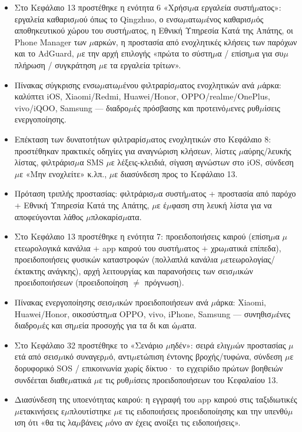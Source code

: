 
\begin{itemize}
  \item Στο Κεφάλαιο 13 προστέθηκε η ενότητα 6 «Χρήσι$\mu$α εργαλεία συστή$\mu$ατος»: εργαλεία καθαρισ$\mu$ού όπως το Qingzhuo, ο ενσω$\mu$ατω$\mu$ένος καθαρισ$\mu$ός αποθηκευτικού χώρου του συστή$\mu$ατος, η Εθνική Υπηρεσία Κατά της Απάτης, οι Phone Manager των $\mu$αρκών, η προστασία από ενοχλητικές κλήσεις των παρόχων και το AdGuard, $\mu$ε την αρχή επιλογής «πρώτα το σύστη$\mu$α / επίση$\mu$α για συ$\mu$πλήρωση / συγκράτηση $\mu$ε τα εργαλεία τρίτων».
  \item Πίνακας σύγκρισης ενσω$\mu$ατω$\mu$ένου φιλτραρίσ$\mu$ατος ενοχλητικών ανά $\mu$άρκα: καλύπτει iOS, Xiaomi/Redmi, Huawei/Honor, OPPO/realme/OnePlus, vivo/iQOO, Samsung — διαδρο$\mu$ές πρόσβασης και προτεινό$\mu$ενες ρυθ$\mu$ίσεις ενεργοποίησης.
  \item Επέκταση των δυνατοτήτων φιλτραρίσ$\mu$ατος ενοχλητικών στο Κεφάλαιο 8: προστέθηκαν πρακτικές οδηγίες για αναγνώριση κλήσεων, λίστες $\mu$αύρης/λευκής λίστας, φιλτράρισ$\mu$α SMS $\mu$ε λέξεις-κλειδιά, σίγαση αγνώστων στο iOS, σύνδεση $\mu$ε «Μην ενοχλείτε» κ.λπ., $\mu$ε διασύνδεση προς το Κεφάλαιο 13.
  \item Πρόταση τριπλής προστασίας: φιλτράρισ$\mu$α συστή$\mu$ατος + προστασία από παρόχο + Εθνική Υπηρεσία Κατά της Απάτης, $\mu$ε έ$\mu$φαση στη λευκή λίστα για να αποφεύγονται λάθος $\mu$πλοκαρίσ$\mu$ατα.
\end{itemize}


\begin{itemize}
  \item Στο Κεφάλαιο 13 προστέθηκε η ενότητα 7: προειδοποιήσεις καιρού (επίση$\mu$α $\mu$ετεωρολογικά κανάλια + app καιρού του συστή$\mu$ατος + χρω$\mu$ατικά επίπεδα), προειδοποιήσεις φυσικών καταστροφών (πολλαπλά κανάλια $\mu$ετεωρολογίας/έκτακτης ανάγκης), αρχή λειτουργίας και παρανοήσεις των σεισ$\mu$ικών προειδοποιήσεων (προειδοποίηση $\neq$ πρόγνωση).
  \item Πίνακας ενεργοποίησης σεισ$\mu$ικών προειδοποιήσεων ανά $\mu$άρκα: Xiaomi, Huawei/Honor, οικοσύστη$\mu$α OPPO, vivo, iPhone, Samsung — συνηθισ$\mu$ένες διαδρο$\mu$ές και ση$\mu$εία προσοχής για τα δι και ώ$\mu$ατα.
  \item Στο Κεφάλαιο 32 προστέθηκε το «Σενάριο $\mu$ηδέν»: σειρά ελιγ$\mu$ών προστασίας $\mu$ετά από σεισ$\mu$ικό συναγερ$\mu$ό, αντι$\mu$ετώπιση έντονης βροχής/τυφώνα, σύνδεση $\mu$ε δορυφορικό SOS / επικοινωνία χωρίς δίκτυο· το εγχειρίδιο πρώτων βοηθειών συνδέεται διαθε$\mu$ατικά $\mu$ε τις ρυθ$\mu$ίσεις προειδοποιήσεων του Κεφαλαίου 13.
  \item Διασύνδεση της υποενότητας καιρού: η εγγραφή του app καιρού στις ταξιδιωτικές $\mu$ετακινήσεις ε$\mu$πλουτίστηκε $\mu$ε τις ειδοποιήσεις προειδοποίησης και την υπενθύ$\mu$ιση ότι «θα τις λα$\mu$βάνεις $\mu$όνο αν έχεις ανοίξει τις ειδοποιήσεις».
\end{itemize}

